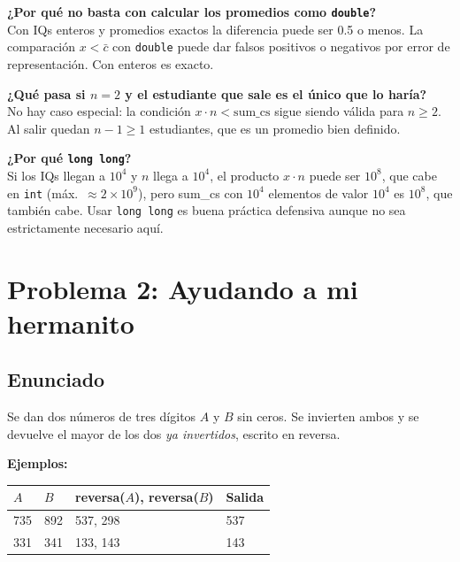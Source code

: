 \documentclass[12pt, oneside]{article}
\begin{document}
\begin{notaprofesor}
  \textbf{¿Por qué no basta con calcular los promedios como \texttt{double}?}\\
  Con IQs enteros y promedios exactos la diferencia puede ser 0.5 o menos.
  La comparación $x < \bar{c}$ con \texttt{double} puede dar falsos positivos
  o negativos por error de representación.  Con enteros es exacto.

  \medskip
  \textbf{¿Qué pasa si $n = 2$ y el estudiante que sale es el único que lo
  haría?}\\
  No hay caso especial: la condición $x \cdot n < \text{sum\_cs}$ sigue
  siendo válida para $n \geq 2$.  Al salir quedan $n - 1 \geq 1$ estudiantes,
  que es un promedio bien definido.

  \medskip
  \textbf{¿Por qué \texttt{long long}?}\\
  Si los IQs llegan a $10^4$ y $n$ llega a $10^4$, el producto
  $x \cdot n$ puede ser $10^8$, que cabe en \texttt{int} (máx.\ $\approx
  2 \times 10^9$), pero sum\_cs con $10^4$ elementos de valor $10^4$ es
  $10^8$, que también cabe.  Usar \texttt{long long} es buena práctica
  defensiva aunque no sea estrictamente necesario aquí.
\end{notaprofesor}

\newpage

\section{Problema 2: Ayudando a mi hermanito}

\subsection{Enunciado}

Se dan dos números de tres dígitos $A$ y $B$ sin ceros.  Se invierten ambos
y se devuelve el mayor de los dos \textit{ya invertidos}, escrito en reversa.

\textbf{Ejemplos:}
\begin{center}
\begin{tabular}{llll}
  \toprule
  $A$ & $B$ & reversa($A$), reversa($B$) & Salida \\
  \midrule
  735 & 892 & 537, 298 & 537 \\
  331 & 341 & 133, 143 & 143 \\
  \bottomrule
\end{tabular}
\end{center}
\end{document}
